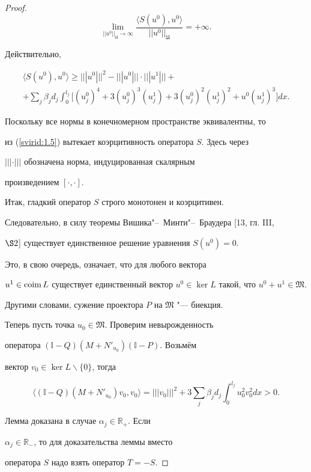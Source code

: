 \begin{proof}
$$\lim\limits_{||u^0||_\mathfrak{U}\rightarrow\infty}\frac{\langle S(u^0),u^0\rangle}{||u^0||_\mathfrak{U}}=+\infty.$$

Дейст\-ви\-тель\-но,

\begin{multline}\label{svirid:1.5}

\langle S(u^0), u^0\rangle \geq |||

u^0|||^2-|||u^0|||\cdot|||u^1|||+{} \\ +\sum\limits_j\beta_jd_j\int_0^{l_j}\bigl[(u_j^0)^4+3(u_j^0)^3(u_j^1)+

3(u_j^0)^2(u_j^1)^2+u^0(u_j^1)^3\bigr]dx.

\end{multline}

Поскольку все нормы в конечномерном пространстве эквивалентны, то

из (\ref{svirid:1.5}) вытекает коэрцитивность оператора $S$. Здесь через

$|||\cdot|||$ обозначена норма, индуцированная скалярным

произведением $[\cdot, \cdot]$.



Итак, гладкий оператор $S$ строго монотонен и коэрцитивен.

Сле\-до\-ва\-тель\-но, в силу теоремы Вишика"--~Минти"--~Браудера [13, гл. III,

$\S 2$] су\-щест\-ву\-ет единственное решение уравнения $S(u^0)=0$.

Это, в свою очередь, означает, что для любого вектора

$u^1\in{\rm coim \, } L$ существует единственный вектор \mbox{$u^0\in\ker

L$} такой, что $u^0+u^1\in\mathfrak{M}$.

Другими словами, сужение проектора $P$ на $\mathfrak{M}$ "--- биекция.



Теперь пусть точка $u_0\in\mathfrak{M}$. Проверим невырожденность

оператора \linebreak ${(\mathbb{I}-Q)}(M+N'_{u_0})(\mathbb{I}-P)$. Возьмём

вектор $v_0\in\ker L\backslash\{0\}$, тогда

$$\langle(\mathbb{I}-Q)(M+N'_{u_0})v_0,v_0\rangle=|||v_0|||^2+3\sum\limits_j\beta_jd_j\int_0^{l_j}u_0^2v_0^2dx>0.$$



Лемма доказана в случае $\alpha_j\in\mathbb{R}_+$. Если

$\alpha_j\in\mathbb{R}_-$, то для доказательства леммы вместо

оператора $S$ надо взять оператор $T=-S$.

\end{proof}



